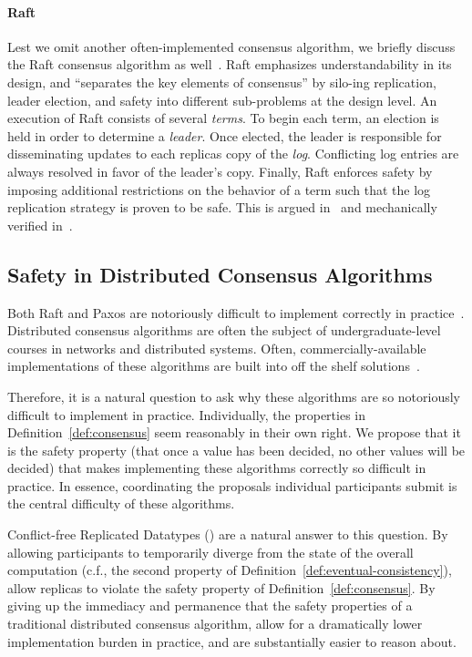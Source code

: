 \paragraph{Raft}
Lest we omit another often-implemented consensus algorithm, we briefly discuss
the Raft consensus algorithm as well~\citep{ongaro14}. Raft emphasizes
understandability in its design, and ``separates the key elements of consensus''
by silo-ing replication, leader election, and safety into different sub-problems
at the design level. An execution of Raft consists of several \textit{terms}. To
begin each term, an election is held in order to determine a \textit{leader}.
Once elected, the leader is responsible for disseminating updates to each
replicas copy of the \textit{log}. Conflicting log entries are always resolved
in favor of the leader's copy. Finally, Raft enforces safety by imposing
additional restrictions on the behavior of a term such that the log replication
strategy is proven to be safe. This is argued in~\citep{ongaro14} and
mechanically verified in~\citep{wilcox15}.

\subsection{Safety in Distributed Consensus Algorithms}

\sloppy
Both Raft and Paxos are notoriously difficult to implement correctly in
practice~\citep{howard20}. Distributed consensus algorithms are often the
subject of undergraduate-level courses in networks and distributed systems.
Often, commercially-available implementations of these algorithms are built into
off the shelf solutions~\citep{etcd,zookeeper}.

Therefore, it is a natural question to ask why these algorithms are so
notoriously difficult to implement in practice. Individually, the properties in
Definition~\ref{def:consensus} seem reasonably in their own right. We propose
that it is the safety property (that once a value has been decided, no other
values will be decided) that makes implementing these algorithms correctly so
difficult in practice. In essence, coordinating the proposals individual
participants submit is the central difficulty of these algorithms.

Conflict-free Replicated Datatypes (\CRDTs) are a natural answer to this
question. By allowing participants to temporarily diverge from the state of the
overall computation (c.f., the second property of
Definition~\ref{def:eventual-consistency}), \CRDTs allow replicas to violate the
safety property of Definition~\ref{def:consensus}. By giving up the immediacy
and permanence that the safety properties of a traditional distributed consensus
algorithm, \CRDTs allow for a dramatically lower implementation burden in
practice, and are substantially easier to reason about.

